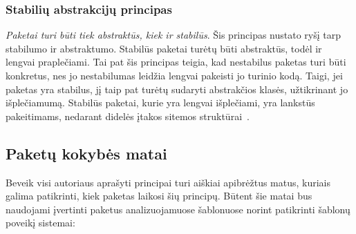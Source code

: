 \subsubsection{Stabilių abstrakcijų principas}
\textit{Paketai turi būti tiek abstraktūs, kiek ir stabilūs}.
Šis principas nustato ryšį tarp stabilumo ir abstraktumo.
Stabilūs paketai turėtų būti abstraktūs, todėl ir lengvai praplečiami.
Tai pat šis principas teigia, kad nestabilus paketas turi būti konkretus, nes jo nestabilumas leidžia lengvai pakeisti jo turinio kodą.
Taigi, jei paketas yra stabilus, jį taip pat turėtų sudaryti abstrakčios klasės, užtikrinant jo išplečiamumą.
Stabilūs paketai, kurie yra lengvai išplečiami, yra lankstūs pakeitimams, nedarant didelės įtakos sitemos struktūrai~\cite{AgileSoftwareDevelopment}.

\subsection{Paketų kokybės matai}
\label{sec:matai}
Beveik visi autoriaus aprašyti principai turi aiškiai apibrėžtus matus, kuriais galima patikrinti, kiek paketas laikosi šių principų.
Būtent šie matai bus naudojami įvertinti paketus analizuojamuose šablonuose norint patikrinti šablonų poveikį sistemai:
